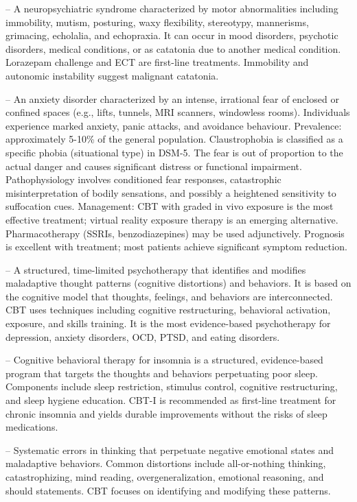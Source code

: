 -- A neuropsychiatric syndrome characterized by motor abnormalities including immobility, mutism, posturing, waxy flexibility, stereotypy, mannerisms, grimacing, echolalia, and echopraxia. It can occur in mood disorders, psychotic disorders, medical conditions, or as catatonia due to another medical condition. Lorazepam challenge and ECT are first-line treatments. Immobility and autonomic instability suggest malignant catatonia.

-- An anxiety disorder characterized by an intense, irrational fear of enclosed or confined spaces (e.g., lifts, tunnels, MRI scanners, windowless rooms). Individuals experience marked anxiety, panic attacks, and avoidance behaviour. Prevalence: approximately 5-10\% of the general population. Claustrophobia is classified as a specific phobia (situational type) in DSM-5. The fear is out of proportion to the actual danger and causes significant distress or functional impairment. Pathophysiology involves conditioned fear responses, catastrophic misinterpretation of bodily sensations, and possibly a heightened sensitivity to suffocation cues. Management: CBT with graded in vivo exposure is the most effective treatment; virtual reality exposure therapy is an emerging alternative. Pharmacotherapy (SSRIs, benzodiazepines) may be used adjunctively. Prognosis is excellent with treatment; most patients achieve significant symptom reduction.

-- A structured, time-limited psychotherapy that identifies and modifies maladaptive thought patterns (cognitive distortions) and behaviors. It is based on the cognitive model that thoughts, feelings, and behaviors are interconnected. CBT uses techniques including cognitive restructuring, behavioral activation, exposure, and skills training. It is the most evidence-based psychotherapy for depression, anxiety disorders, OCD, PTSD, and eating disorders.

-- Cognitive behavioral therapy for insomnia is a structured, evidence-based program that targets the thoughts and behaviors perpetuating poor sleep. Components include sleep restriction, stimulus control, cognitive restructuring, and sleep hygiene education. CBT-I is recommended as first-line treatment for chronic insomnia and yields durable improvements without the risks of sleep medications.

-- Systematic errors in thinking that perpetuate negative emotional states and maladaptive behaviors. Common distortions include all-or-nothing thinking, catastrophizing, mind reading, overgeneralization, emotional reasoning, and should statements. CBT focuses on identifying and modifying these patterns.


